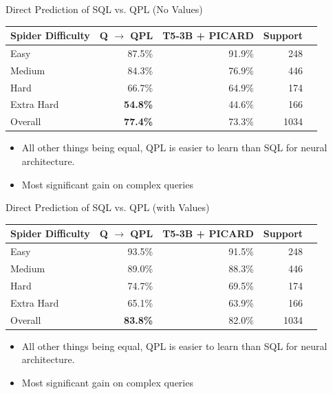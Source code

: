 \documentclass{beamer}
\begin{document}
\begin{frame}{Direct Prediction of SQL vs. QPL (No Values)}
    \begin{table}[h]
    \centering
    \begin{tabular}{lrrrr}
    \toprule
    Spider Difficulty & Q $\rightarrow$ QPL & T5-3B + PICARD & Support \\ \midrule
    Easy        & 87.5\%  & 91.9\% & 248  \\
    Medium      & 84.3\%  & 76.9\% & 446  \\
    Hard        & 66.7\%  & 64.9\% & 174  \\
    Extra Hard  & \alert{\textbf{54.8\%}}  & 44.6\% & 166  \\
    \midrule
    Overall & \textbf{77.4\%} & 73.3\% & 1034 \\
    \bottomrule
    \end{tabular}
    \end{table}

    \begin{itemize}
        \item All other things being equal, QPL is easier to learn than SQL for neural architecture.
        \item Most significant gain on \alert{complex queries}
    \end{itemize}
\end{frame}

\begin{frame}{Direct Prediction of SQL vs. QPL (with Values)}
    \begin{table}[h]
    \centering
    \begin{tabular}{lrrrr}
    \toprule
    Spider Difficulty & Q $\rightarrow$ QPL & T5-3B + PICARD & Support \\ \midrule
    Easy	    & 93.5\%  & 91.5\% & 248  \\
    Medium	    & 89.0\%  & 88.3\% & 446  \\
    Hard	    & 74.7\%  & 69.5\% & 174  \\
    Extra Hard	& 65.1\%  & 63.9\% & 166  \\
    \midrule
    Overall	    & \textbf{83.8\%}  & 82.0\% & 1034 \\
    \bottomrule
    \end{tabular}
    \end{table}

    \begin{itemize}
        \item All other things being equal, QPL is easier to learn than SQL for neural architecture.
        \item Most significant gain on \alert{complex queries}
    \end{itemize}
\end{frame}
\end{document}
